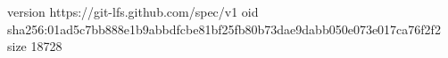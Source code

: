 version https://git-lfs.github.com/spec/v1
oid sha256:01ad5c7bb888e1b9abbdfcbe81bf25fb80b73dae9dabb050e073e017ca76f2f2
size 18728
